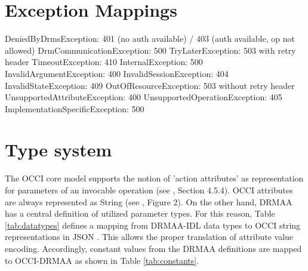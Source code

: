 \documentclass[10pt]{article}
\begin{document}

\section{Exception Mappings}

DeniedByDrmsException: 401 (no auth available) / 403 (auth available, op not allowed)
DrmCommunicationException: 500
TryLaterException: 503 with retry header
TimeoutException: 410
InternalException: 500
InvalidArgumentException: 400
InvalidSessionException: 404
InvalidStateException: 409
OutOfResourceException: 503 without retry header
UnsupportedAttributeException: 400
UnsupportedOperationException: 405
ImplementationSpecificException: 500

\section{Type system}

The OCCI core model supports the notion of 'action attributes' as representation for parameters of an invocable operation (see \cite{gfd183}, Section 4.5.4). OCCI attributes are always represented as String (see \cite{gfd183}, Figure 2). On the other hand, DRMAA has a central definition of utilized parameter types. For this reason, Table \ref{tab:datatypes} defines a mapping from DRMAA-IDL data types to OCCI string representations in JSON \cite{json}. This allows the proper translation of attribute value encoding. Accordingly, constant values from the DRMAA definitions are mapped to OCCI-DRMAA as shown in Table \ref{tab:constants}.
\end{document}
